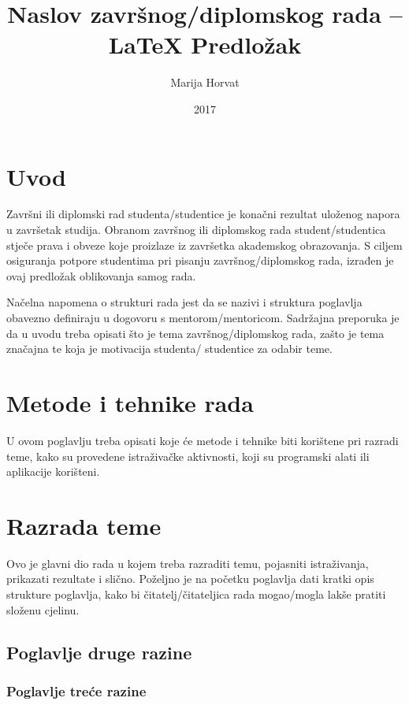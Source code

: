 \documentclass{foi}
\title{Naslov zavr\v snog/diplomskog rada -- LaTeX Predložak}
\author{Marija Horvat}
\date{2017}
\begin{document}
\maketitle

\tableofcontents

\pagestyle{plain}
\chapter{Uvod}

Završni ili diplomski rad studenta/studentice je konačni rezultat uloženog napora u završetak studija. Obranom završnog ili diplomskog rada student/studentica stječe prava i obveze koje proizlaze iz završetka akademskog obrazovanja. S ciljem osiguranja potpore studentima pri pisanju završnog/diplomskog rada, izrađen je ovaj predložak oblikovanja samog rada.

Načelna napomena o strukturi rada jest da se nazivi i struktura poglavlja obavezno definiraju u dogovoru s mentorom/mentoricom. Sadržajna preporuka je da u uvodu treba opisati što je tema završnog/diplomskog rada, zašto je tema značajna te koja je motivacija studenta/ studentice za odabir teme. 

\chapter{Metode i tehnike rada}

U ovom poglavlju treba opisati koje će metode i tehnike biti korištene pri razradi teme, kako su provedene istraživačke aktivnosti, koji su programski alati ili aplikacije korišteni.

\lipsum[1-2]

\chapter{Razrada teme}

Ovo je glavni dio rada u kojem treba razraditi temu, pojasniti istraživanja, prikazati rezultate i slično. Poželjno je na početku poglavlja dati kratki opis strukture poglavlja, kako bi čitatelj/čitateljica rada mogao/mogla lakše pratiti složenu cjelinu.

\section{Poglavlje druge razine }

\lipsum[1]

\subsection{Poglavlje treće razine}
\end{document}
